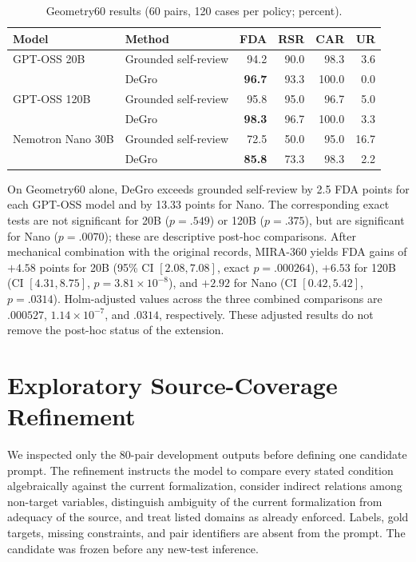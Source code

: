 \documentclass[10pt]{article}
\begin{document}
\begin{table}[h]
\centering
\caption{Geometry60 results (60 pairs, 120 cases per policy; percent).}
\begin{tabular}{@{}llrrrr@{}}
\toprule
Model & Method & FDA & RSR & CAR & UR\\
\midrule
GPT-OSS 20B & Grounded self-review & 94.2 & 90.0 & 98.3 & 3.6\\
 & DeGro & \textbf{96.7} & 93.3 & 100.0 & 0.0\\
\midrule
GPT-OSS 120B & Grounded self-review & 95.8 & 95.0 & 96.7 & 5.0\\
 & DeGro & \textbf{98.3} & 96.7 & 100.0 & 3.3\\
\midrule
Nemotron Nano 30B & Grounded self-review & 72.5 & 50.0 & 95.0 & 16.7\\
 & DeGro & \textbf{85.8} & 73.3 & 98.3 & 2.2\\
\bottomrule
\end{tabular}
\end{table}

On Geometry60 alone, DeGro exceeds grounded self-review by 2.5 FDA points for each GPT-OSS model and by 13.33 points for Nano. The corresponding exact tests are not significant for 20B ($p=.549$) or 120B ($p=.375$), but are significant for Nano ($p=.0070$); these are descriptive post-hoc comparisons. After mechanical combination with the original records, MIRA-360 yields FDA gains of $+4.58$ points for 20B (95\% CI $[2.08,7.08]$, exact $p=.000264$), $+6.53$ for 120B (CI $[4.31,8.75]$, $p=3.81\times10^{-8}$), and $+2.92$ for Nano (CI $[0.42,5.42]$, $p=.0314$). Holm-adjusted values across the three combined comparisons are $.000527$, $1.14\times10^{-7}$, and $.0314$, respectively. These adjusted results do not remove the post-hoc status of the extension.

\section{Exploratory Source-Coverage Refinement}
We inspected only the 80-pair development outputs before defining one candidate prompt. The refinement instructs the model to compare every stated condition algebraically against the current formalization, consider indirect relations among non-target variables, distinguish ambiguity of the current formalization from adequacy of the source, and treat listed domains as already enforced. Labels, gold targets, missing constraints, and pair identifiers are absent from the prompt. The candidate was frozen before any new-test inference.
\end{document}
